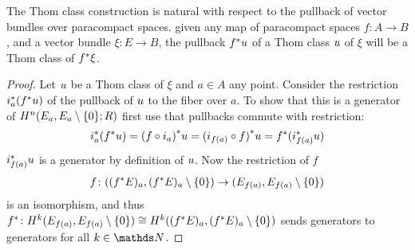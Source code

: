 \begin{Cor}
  The Thom class construction is natural with respect to the pullback
  of vector bundles over paracompact spaces.
  \Idest given any map of paracompact spaces $f\colon A\to B$, and a
  vector bundle $\xi\colon E\to B$,
  the pullback ${f}^* u$ of a Thom class $u$ of $\xi$ will
  be a Thom class of ${f}^* \xi$.
  \begin{proof}
    Let $u$ be a Thom class of $\xi$ and $a\in A$ any point.
    Consider the restriction ${i}^*_a({f}^* u)$
    of the pullback of $u$ to the fiber over $a$. To show that this
    is a generator of $H^n(E_a, {E_a}\setminus\{0\};R)$ first use that
    pullbacks commute with restriction:
    \begin{gather*}
      {i}^*_a({f}^* u)
      = {(f\circ i_a)}^* u
      = {(i_{f(a)}\circ f)}^* u
      = {f}^* ({i}^*_{f(a)} u)
    \end{gather*}
    ${i}^*_{f(a)} u$ is a generator by definition of $u$.
    Now the restriction of $f$
    \begin{gather*}
      f\colon (({f}^* E)_a, {({f}^* E)_a}\setminus\{0\}) \to (E_{f(a)}, {E_{f(a)}}\setminus\{0\})
    \end{gather*}
    is an isomorphism, and thus
    ${f}^*\colon H^k(E_{f(a)}, {E_{f(a)}}\setminus\{0\})
    \cong H^k(({f}^* E)_a, {({f}^* E)_a}\setminus\{0\})$
    sends generators to generators for all $k\in\Nat$.
  \end{proof}
\end{Cor}

